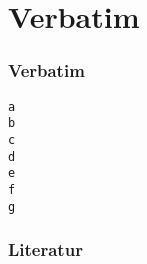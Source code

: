 \documentclass[ignorenonframetext]{beamer}
\begin{document}
\section{Verbatim}


\begin{frame}[fragile]
\frametitle{Verbatim}
\begin{verbatim}
a
b
c
d
e
f
g
\end{verbatim}
\end{frame}



\begin{frame}[allowframebreaks]
    \frametitle{Literatur}
    
    
    \nocite{*}
\end{frame}
\end{document}
